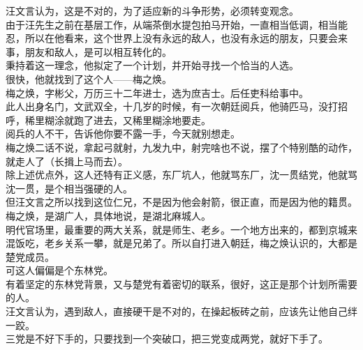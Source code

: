 \begin{multicols}{\theparacolNo}
汪文言认为，这是不对的，为了适应新的斗争形势，必须转变观念。\\

由于汪先生之前在基层工作，从端茶倒水提包拍马开始，一直相当低调，相当能忍，所以在他看来，这个世界上没有永远的敌人，也没有永远的朋友，只要会来事，朋友和敌人，是可以相互转化的。\\

秉持着这一理念，他拟定了一个计划，并开始寻找一个恰当的人选。\\

很快，他就找到了这个人——梅之焕。\\

梅之焕，字彬父，万历三十二年进士，选为庶吉士。后任吏科给事中。\\

此人出身名门，文武双全，十几岁的时候，有一次朝廷阅兵，他骑匹马，没打招呼，稀里糊涂就跑了进去，又稀里糊涂地要走。\\

阅兵的人不干，告诉他你要不露一手，今天就别想走。\\

梅之焕二话不说，拿起弓就射，九发九中，射完啥也不说，摆了个特别酷的动作，就走人了（长揖上马而去）。\\

除上述优点外，这人还特有正义感，东厂坑人，他就骂东厂，沈一贯结党，他就骂沈一贯，是个相当强硬的人。\\

但汪文言之所以找到这位仁兄，不是因为他会射箭，很正直，而是因为他的籍贯。\\

梅之焕，是湖广人，具体地说，是湖北麻城人。\\

明代官场里，最重要的两大关系，就是师生、老乡。一个地方出来的，都到京城来混饭吃，老乡关系一攀，就是兄弟了。所以自打进入朝廷，梅之焕认识的，大都是楚党成员。\\

可这人偏偏是个东林党。\\

有着坚定的东林党背景，又与楚党有着密切的联系，很好，这正是那个计划所需要的人。\\

汪文言认为，遇到敌人，直接硬干是不对的，在操起板砖之前，应该先让他自己绊一跤。\\

三党是不好下手的，只要找到一个突破口，把三党变成两党，就好下手了。\\


\end{multicols}
